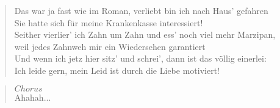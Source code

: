 \documentclass[9pt,a4paper,oneside, onecolumn]{article}
\begin{document}
\begin{verse}
Das \Em{}war ja fast wie im Roman, verliebt bin ich nach Haus' gefahren\\
Sie \D{}hatte sich für meine Kranken\Em{}kasse interessiert!\\
Seit\Em{}her vierlier' ich Zahn um Zahn und ess' noch viel mehr Marzipan,\\
weil \D{}jedes Zahnweh mir ein Wieder\Em{}sehen garantiert\\
Und \Em{}wenn ich jetz hier sitz' und schrei', dann ist das völlig einerlei:\\
Ich \D{}leide gern, mein Leid ist durch die \Em{}Liebe motiviert!\\
\end{verse}

\begin{verse}
$Chorus$\\
\quad{}Ahahah...
\end{verse}
\end{document}
